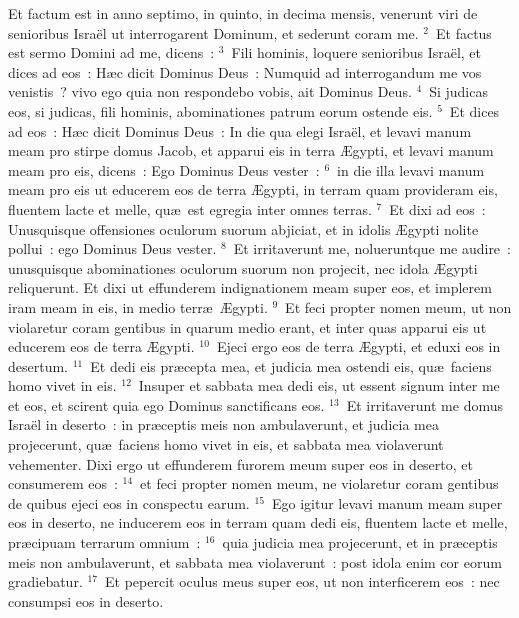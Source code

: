 \lettrine[lines=10,image=true,loversize=0.05,lraise=-0.03]{E}{}t factum est in anno septimo, in quinto, in decima mensis, venerunt viri de senioribus Isra\"el ut interrogarent Dominum, et sederunt coram me.
${}^{2}$~Et factus est sermo Domini ad me, dicens~:
${}^{3}$~Fili hominis, loquere senioribus Isra\"el, et dices ad eos~: H\ae c dicit Dominus Deus~: Numquid ad interrogandum me vos venistis~? vivo ego quia non respondebo vobis, ait Dominus Deus.
${}^{4}$~Si judicas eos, si judicas, fili hominis, abominationes patrum eorum ostende eis.
${}^{5}$~Et dices ad eos~: H\ae c dicit Dominus Deus~: In die qua elegi Isra\"el, et levavi manum meam pro stirpe domus Jacob, et apparui eis in terra \AE gypti, et levavi manum meam pro eis, dicens~: Ego Dominus Deus vester~:
${}^{6}$~in die illa levavi manum meam pro eis ut educerem eos de terra \AE gypti, in terram quam provideram eis, fluentem lacte et melle, qu\ae\ est egregia inter omnes terras.
${}^{7}$~Et dixi ad eos~: Unusquisque offensiones oculorum suorum abjiciat, et in idolis \AE gypti nolite pollui~: ego Dominus Deus vester.
${}^{8}$~Et irritaverunt me, nolueruntque me audire~: unusquisque abominationes oculorum suorum non projecit, nec idola \AE gypti reliquerunt. Et dixi ut effunderem indignationem meam super eos, et implerem iram meam in eis, in medio terr\ae\ \AE gypti.
${}^{9}$~Et feci propter nomen meum, ut non violaretur coram gentibus in quarum medio erant, et inter quas apparui eis ut educerem eos de terra \AE gypti.
${}^{10}$~Ejeci ergo eos de terra \AE gypti, et eduxi eos in desertum.
${}^{11}$~Et dedi eis pr\ae cepta mea, et judicia mea ostendi eis, qu\ae\ faciens homo vivet in eis.
${}^{12}$~Insuper et sabbata mea dedi eis, ut essent signum inter me et eos, et scirent quia ego Dominus sanctificans eos.
${}^{13}$~Et irritaverunt me domus Isra\"el in deserto~: in pr\ae ceptis meis non ambulaverunt, et judicia mea projecerunt, qu\ae\ faciens homo vivet in eis, et sabbata mea violaverunt vehementer. Dixi ergo ut effunderem furorem meum super eos in deserto, et consumerem eos~:
${}^{14}$~et feci propter nomen meum, ne violaretur coram gentibus de quibus ejeci eos in conspectu earum.
${}^{15}$~Ego igitur levavi manum meam super eos in deserto, ne inducerem eos in terram quam dedi eis, fluentem lacte et melle, pr\ae cipuam terrarum omnium~:
${}^{16}$~quia judicia mea projecerunt, et in pr\ae ceptis meis non ambulaverunt, et sabbata mea violaverunt~: post idola enim cor eorum gradiebatur.
${}^{17}$~Et pepercit oculus meus super eos, ut non interficerem eos~: nec consumpsi eos in deserto.
